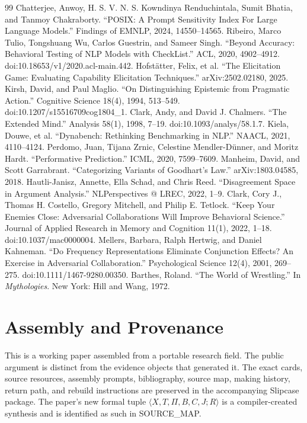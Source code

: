 \documentclass[11pt]{article}
\begin{document}
\begin{thebibliography}{99}
 Chatterjee, Anwoy, H. S. V. N. S. Kowndinya Renduchintala, Sumit Bhatia, and Tanmoy Chakraborty. ``POSIX: A Prompt Sensitivity Index For Large Language Models.'' Findings of EMNLP, 2024, 14550--14565.
 Ribeiro, Marco Tulio, Tongshuang Wu, Carlos Guestrin, and Sameer Singh. ``Beyond Accuracy: Behavioral Testing of NLP Models with CheckList.'' ACL, 2020, 4902--4912. doi:10.18653/v1/2020.acl-main.442.
 Hofst\"atter, Felix, et al. ``The Elicitation Game: Evaluating Capability Elicitation Techniques.'' arXiv:2502.02180, 2025.
 Kirsh, David, and Paul Maglio. ``On Distinguishing Epistemic from Pragmatic Action.'' Cognitive Science 18(4), 1994, 513--549. doi:10.1207/s15516709cog1804\_1.
 Clark, Andy, and David J. Chalmers. ``The Extended Mind.'' Analysis 58(1), 1998, 7--19. doi:10.1093/analys/58.1.7.
 Kiela, Douwe, et al. ``Dynabench: Rethinking Benchmarking in NLP.'' NAACL, 2021, 4110--4124.
 Perdomo, Juan, Tijana Zrnic, Celestine Mendler-D\"unner, and Moritz Hardt. ``Performative Prediction.'' ICML, 2020, 7599--7609.
 Manheim, David, and Scott Garrabrant. ``Categorizing Variants of Goodhart's Law.'' arXiv:1803.04585, 2018.
 Hautli-Janisz, Annette, Ella Schad, and Chris Reed. ``Disagreement Space in Argument Analysis.'' NLPerspectives @ LREC, 2022, 1--9.
 Clark, Cory J., Thomas H. Costello, Gregory Mitchell, and Philip E. Tetlock. ``Keep Your Enemies Close: Adversarial Collaborations Will Improve Behavioral Science.'' Journal of Applied Research in Memory and Cognition 11(1), 2022, 1--18. doi:10.1037/mac0000004.
 Mellers, Barbara, Ralph Hertwig, and Daniel Kahneman. ``Do Frequency Representations Eliminate Conjunction Effects? An Exercise in Adversarial Collaboration.'' Psychological Science 12(4), 2001, 269--275. doi:10.1111/1467-9280.00350.
 Barthes, Roland. ``The World of Wrestling.'' In \emph{Mythologies}. New York: Hill and Wang, 1972.
\end{thebibliography}

\appendix
\section{Assembly and Provenance}
This is a working paper assembled from a portable research field. The public argument is distinct from the evidence objects that generated it. The exact cards, source resources, assembly prompts, bibliography, source map, making history, return path, and rebuild instructions are preserved in the accompanying Slipcase package. The paper's new formal tuple $\langle X,T,\Pi,B,C,J;R\rangle$ is a compiler-created synthesis and is identified as such in SOURCE\_MAP.
\end{document}
